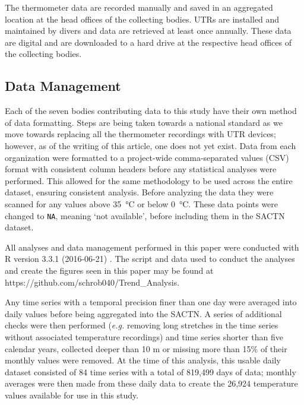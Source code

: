 \documentclass[]{ametsoc}
\begin{document}
The thermometer data are recorded manually and saved in an aggregated location at the head offices of the collecting bodies. UTRs are installed and maintained by divers and data are retrieved at least once annually. These data are digital and are downloaded to a hard drive at the respective head offices of the collecting bodies.

\subsection{Data Management}
Each of the seven bodies contributing data to this study have their own method of data formatting. Steps are being taken towards a national standard as we move towards replacing all the thermometer recordings with UTR devices; however, as of the writing of this article, one does not yet exist. Data from each organization were formatted to a project-wide comma-separated values (CSV) format with consistent column headers before any statistical analyses were performed. This allowed for the same methodology to be used across the entire dataset, ensuring consistent analysis. Before analyzing the data they were scanned for any values above \SI{35}{\degreeCelsius} or below \SI{0}{\degreeCelsius}. These data points were changed to \texttt{NA}, meaning `not available', before including them in the SACTN dataset.

All analyses and data management performed in this paper were conducted with R version 3.3.1 (2016-06-21) \citep{R}. The script and data used to conduct the analyses and create the figures seen in this paper may be found at https://github.com/schrob040/Trend\_Analysis.

Any time series with a temporal precision finer than one day were averaged into daily values before being aggregated into the SACTN. A series of additional checks were then performed (\emph{e.g.} removing long stretches in the time series without associated temperature recordings) and time series shorter than five calendar years, collected deeper than 10 m or missing more than 15\% of their monthly values were removed. At the time of this analysis, this usable daily dataset consisted of 84 time series with a total of 819,499 days of data; monthly averages were then made from these daily data to create the 26,924 temperature values available for use in this study.
\end{document}
